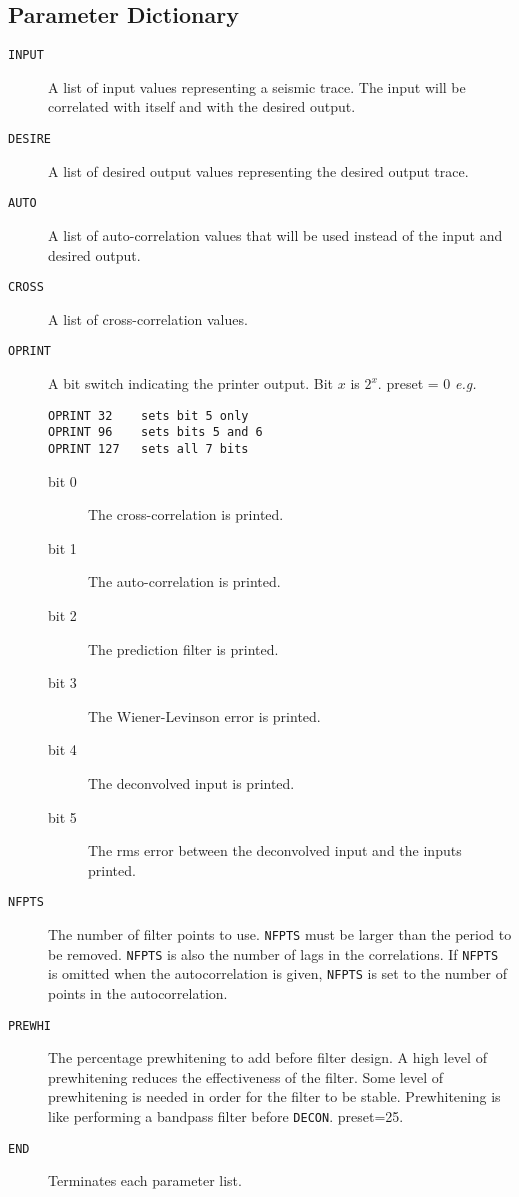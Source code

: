 \subsection{Parameter Dictionary}

\begin{description}
\item[\texttt{INPUT}] A list of input values representing a seismic trace.  The input will be correlated with itself and with the desired output.

\item[\texttt{DESIRE}] A list of desired output values representing the desired output trace.

\item[\texttt{AUTO}] A list of auto-correlation values that will be used instead of the input and desired output.

\item[\texttt{CROSS}] A list of cross-correlation values.

\item[\texttt{OPRINT}] A bit switch indicating the printer output.  Bit $x$ is $2^{x}$.
         \Gls{preset} = 0     \textit{e.g.}
\begin{verbatim}
OPRINT 32    sets bit 5 only
OPRINT 96    sets bits 5 and 6
OPRINT 127   sets all 7 bits
\end{verbatim}
\begin{description}
    \item[bit 0]  The cross-correlation is printed.
    \item[bit 1]  The auto-correlation is printed.
    \item[bit 2]  The prediction filter is printed.
    \item[bit 3]  The Wiener-Levinson error is printed.
    \item[bit 4]  The deconvolved input is printed.
    \item[bit 5]  The \gls{rms} error between the deconvolved input and the inputs printed.
\end{description}

\item[\texttt{NFPTS}] The number of filter points to use.  \texttt{NFPTS} must be larger than
         the period to be removed.  \texttt{NFPTS} is also the number of lags in
         the correlations.  If \texttt{NFPTS} is omitted when the autocorrelation
         is given, \texttt{NFPTS} is set to the number of points in the autocorrelation.

\item[\texttt{PREWHI}] The percentage prewhitening to add before filter design.  A
         high level of prewhitening reduces the effectiveness of the
         filter.  Some level of prewhitening is needed in order for the
         filter to be stable.  Prewhitening is like performing a bandpass
         filter before \texttt{DECON}.
         \Gls{preset}=25.

\item[\texttt{END}] Terminates each parameter list.
\end{description}

